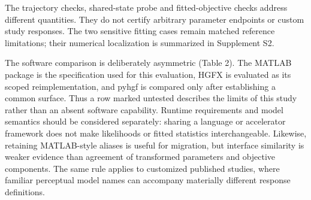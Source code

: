 \documentclass[
  11pt,
]{article}
\begin{document}
The trajectory checks, shared-state probe and fitted-objective checks
address different quantities. They do not certify arbitrary parameter
endpoints or custom study responses. The two sensitive fitting cases
remain matched reference limitations; their numerical localization is
summarized in Supplement S2.

The software comparison is deliberately asymmetric (Table 2). The MATLAB
package is the specification used for this evaluation, HGFX is evaluated
as its scoped reimplementation, and pyhgf is compared only after
establishing a common surface. Thus a row marked untested describes the
limits of this study rather than an absent software capability. Runtime
requirements and model semantics should be considered separately:
sharing a language or accelerator framework does not make likelihoods or
fitted statistics interchangeable. Likewise, retaining MATLAB-style
aliases is useful for migration, but interface similarity is weaker
evidence than agreement of transformed parameters and objective
components. The same rule applies to customized published studies, where
familiar perceptual model names can accompany materially different
response definitions.
\end{document}
